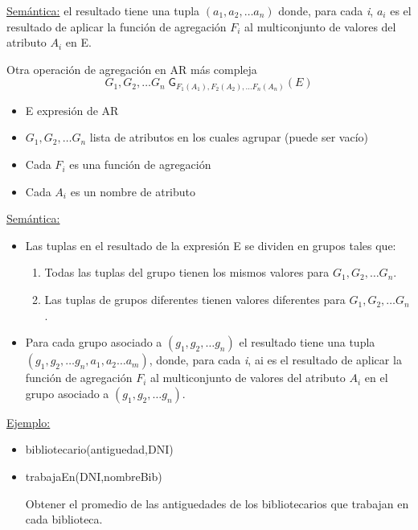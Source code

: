 \documentclass[12pt,a4paper]{report}
\begin{document}
		\par \underline{Semántica:} el resultado tiene una tupla $(a_{1}, a_{2}, \dotsc a_{n})$ donde, para cada \textit{i}, $a_{i}$ es el resultado de aplicar la función de agregación $F_{i}$ al multiconjunto de valores del atributo $A_{i}$ en E.
		\vspace{5mm}	
		\par Otra operación de agregación en AR más compleja
		\[ G_{1}, G_{2}, \dotsc G_{n} \; \mathsf{G}_{F_{1}(A_{1}), F_{2}(A_{2}), \dotsc F_{n}(A_{n})}(E)\]
		\begin{itemize}
			\item E expresión de AR
			\item $G_{1}, G_{2}, \dotsc G_{n}$ lista de atributos en los cuales agrupar (puede ser vacío)
			\item Cada $F_{i}$ es una función de agregación
			\item Cada $A_{i}$ es un nombre de atributo
		\end{itemize}
		\par \underline{Semántica:}
		\begin{itemize}
			\item Las tuplas en el resultado de la expresión E se dividen en grupos tales que:
			\begin{enumerate}
				\item Todas las tuplas del grupo tienen los mismos valores para $G_{1}, G_{2}, \dotsc G_{n}$.
				\item Las tuplas de grupos diferentes tienen valores diferentes para $G_{1}, G_{2}, \dotsc G_{n}$.
			\end{enumerate}
		\item Para cada grupo asociado a $(g_{1}, g_{2}, \dotsc g_{n})$ el resultado tiene una tupla $(g_{1}, g_{2}, \dotsc g_{n}, a_{1}, a_{2} \dotsc a_{m})$, donde, para cada \textit{i}, ai es el resultado de aplicar la función de agregación $F_{i}$ al multiconjunto de valores del atributo $A_{i}$ en el grupo asociado a $(g_{1}, g_{2}, \dotsc g_{n})$.
		\end{itemize}
		
		\underline{Ejemplo:}
		\begin{itemize}
			\item bibliotecario(antiguedad,DNI)
			\item trabajaEn(DNI,nombreBib)
			\par Obtener el promedio de las antiguedades de los bibliotecarios que trabajan en cada biblioteca.
		\end{itemize}
\end{document}
